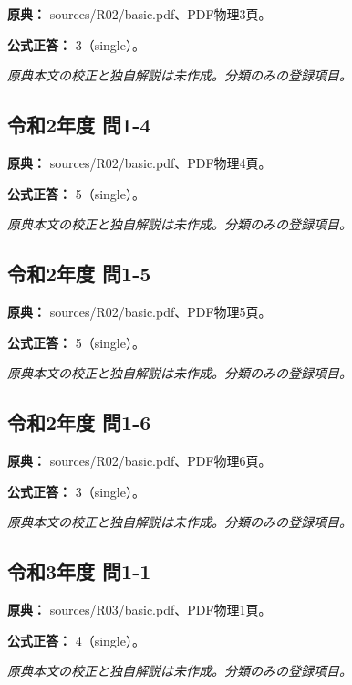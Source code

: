 \noindent\textbf{原典：} sources/R02/basic.pdf、PDF物理3頁。

\textbf{公式正答：} 3（single）。

\par\textit{原典本文の校正と独自解説は未作成。分類のみの登録項目。}

\subsection{令和2年度 問1-4}
\label{q:r02-reg-basic-1-4}

\noindent\textbf{原典：} sources/R02/basic.pdf、PDF物理4頁。

\textbf{公式正答：} 5（single）。

\par\textit{原典本文の校正と独自解説は未作成。分類のみの登録項目。}

\subsection{令和2年度 問1-5}
\label{q:r02-reg-basic-1-5}

\noindent\textbf{原典：} sources/R02/basic.pdf、PDF物理5頁。

\textbf{公式正答：} 5（single）。

\par\textit{原典本文の校正と独自解説は未作成。分類のみの登録項目。}

\subsection{令和2年度 問1-6}
\label{q:r02-reg-basic-1-6}

\noindent\textbf{原典：} sources/R02/basic.pdf、PDF物理6頁。

\textbf{公式正答：} 3（single）。

\par\textit{原典本文の校正と独自解説は未作成。分類のみの登録項目。}

\subsection{令和3年度 問1-1}
\label{q:r03-reg-basic-1-1}

\noindent\textbf{原典：} sources/R03/basic.pdf、PDF物理1頁。

\textbf{公式正答：} 4（single）。

\par\textit{原典本文の校正と独自解説は未作成。分類のみの登録項目。}

